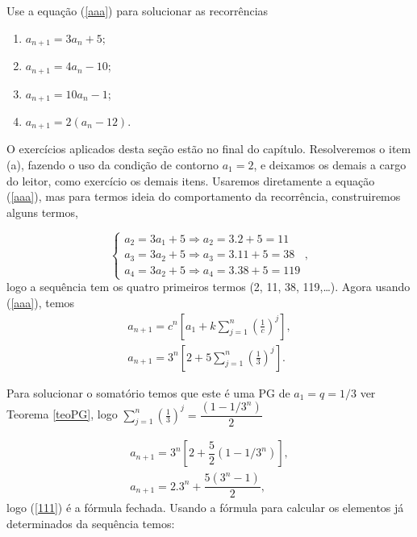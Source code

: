  \begin{example} Use a equação (\ref{aaa}) para solucionar as recorrências
 	 \begin{enumerate}
 	 	\item[(a)] $a_{n+1} = 3a_n + 5$;
 	 	\item[(b)] $a_{n+1} = 4a_n - 10$;
 	 	\item[(c)] $a_{n+1} = 10a_n -1$;
 	 	\item[(d)] $a_{n+1} = 2(a_n - 12)$.
 	 \end{enumerate} 

\end{example}
 	 
\inic O exercícios aplicados desta seção estão no final do capítulo. Resolveremos o item (a), fazendo o uso da condição de contorno $a_1 = 2$, e deixamos os demais a cargo do leitor, como exercício os demais itens. Usaremos diretamente a equação (\ref{aaa}), mas para termos ideia do comportamento da recorrência, construiremos alguns termos,

\begin{equation}
    \begin{cases}
      a_2 = 3a_1 + 5 \Rightarrow a_2 = 3.2 + 5 = 11\\
      a_3 = 3a_2 + 5 \Rightarrow a_3 = 3.11 + 5 = 38\\
      a_4 = 3a_2 + 5 \Rightarrow a_4 = 3.38 + 5 = 119
    \end{cases},
\end{equation}
logo a sequência tem os quatro primeiros termos (2, 11, 38, 119,\dots ). Agora usando (\ref{aaa}), temos 
\begin{align}
    a_{n+1} = c^n\left[a_1 + k \sum_{j=1}^{n}\left(\frac{1}{c}\right)^j\right],\\
    a_{n+1} = 3^n\left[2 + 5 \sum_{j=1}^{n}\left(\frac{1}{3}\right)^j\right].
\end{align}

\inic Para solucionar o somatório temos que este é uma PG de $a_1 = q = 1/3$ ver Teorema \ref{teoPG}, logo $\displaystyle \sum_{j=1}^{n}\left(\frac{1}{3}\right)^j = \dfrac{(1-1/3^n)}{2}$

\begin{align}
    a_{n+1} = 3^n[2 + \dfrac{5}{2}(1-1/3^n)],\\
    a_{n+1} = 2.3^n + \dfrac{5(3^n-1)}{2}, \label{111}
\end{align}
logo (\ref{111}) é a fórmula fechada. Usando a fórmula para calcular os elementos já determinados da sequência temos:

